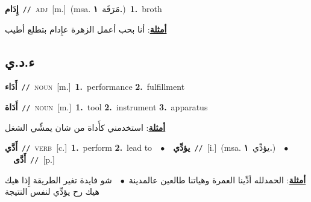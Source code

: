 \documentclass[10pt,a4paper,twoside]{article} %
\begin{document}
\begin{multicols}{2}
{{{{{{{{{{{\setlength\topsep{0pt}\textbf{\foreignlanguage{arabic}{إِدَام}}\ {\color{gray}\texttt{//}\color{black}}\ \textsc{adj}\ [m.]\ \color{gray}(msa. \foreignlanguage{arabic}{مَرَقَة}~\foreignlanguage{arabic}{\textbf{١.}})\color{black}\ \textbf{1.}~broth\  \begin{flushright}\color{gray}\foreignlanguage{arabic}{\textbf{\underline{\foreignlanguage{arabic}{أمثلة}}}: أنا بحب أعمل الزهرة عإِدام بتطلع أطيب}\end{flushright}\color{black}} \vspace{2mm}

\vspace{-3mm}
\subsection*{\color{blue}\foreignlanguage{arabic}{ء.د.ي}\color{blue}{}} 

{\setlength\topsep{0pt}\textbf{\foreignlanguage{arabic}{أَدَاء}}\ {\color{gray}\texttt{//}\color{black}}\ \textsc{noun}\ [m.]\ \textbf{1.}~performance  \textbf{2.}~fulfillment\ 

{\setlength\topsep{0pt}\textbf{\foreignlanguage{arabic}{أَدَاة}}\ {\color{gray}\texttt{//}\color{black}}\ \textsc{noun}\ [m.]\ \textbf{1.}~tool  \textbf{2.}~instrument  \textbf{3.}~apparatus\  \begin{flushright}\color{gray}\foreignlanguage{arabic}{\textbf{\underline{\foreignlanguage{arabic}{أمثلة}}}: استخدمني كأَداة من شان يمشِّي الشغل}\end{flushright}\color{black}} \vspace{2mm}

{\setlength\topsep{0pt}\textbf{\foreignlanguage{arabic}{أَدَّي}}\ {\color{gray}\texttt{//}\color{black}}\ \textsc{verb}\ [c.]\ \textbf{1.}~perform  \textbf{2.}~lead to\ \ $\bullet$\ \ \setlength\topsep{0pt}\textbf{\foreignlanguage{arabic}{يؤدِّي}}\ {\color{gray}\texttt{//}\color{black}}\ [i.]\ \color{gray}(msa. \foreignlanguage{arabic}{يؤدِّي}~\foreignlanguage{arabic}{\textbf{١.}})\color{black}\ \ $\bullet$\ \ \setlength\topsep{0pt}\textbf{\foreignlanguage{arabic}{أَدَّى}}\ {\color{gray}\texttt{//}\color{black}}\ [p.]\  \begin{flushright}\color{gray}\foreignlanguage{arabic}{\textbf{\underline{\foreignlanguage{arabic}{أمثلة}}}: الحمدلله أدِّينا العمرة وهياتنا طالعين عالمدينة\ $\bullet$\ \  شو فايدة تغير الطريقة إِذا هيك هيك رح يؤدِّي لنفس النتيجة}\end{flushright}\color{black}} \vspace{2mm}

}}}}}}}}}}}
\end{multicols}
\end{document}
